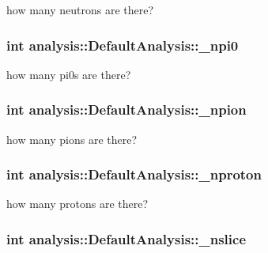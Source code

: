 how many neutrons are there? \hypertarget{classanalysis_1_1DefaultAnalysis_ab6eca9a94c20a6fb7e127043f165ff9b}{
\subsubsection[{\-\_\-npi0}]{\setlength{\rightskip}{0pt plus 5cm}int analysis\-::\-Default\-Analysis\-::\-\_\-npi0\hspace{0.3cm}{\ttfamily [private]}}}\label{classanalysis_1_1DefaultAnalysis_ab6eca9a94c20a6fb7e127043f165ff9b}
how many pi0s are there? \hypertarget{classanalysis_1_1DefaultAnalysis_a39a918abd4b60bf475907f5778ba5e9a}{
\subsubsection[{\-\_\-npion}]{\setlength{\rightskip}{0pt plus 5cm}int analysis\-::\-Default\-Analysis\-::\-\_\-npion\hspace{0.3cm}{\ttfamily [private]}}}\label{classanalysis_1_1DefaultAnalysis_a39a918abd4b60bf475907f5778ba5e9a}
how many pions are there? \hypertarget{classanalysis_1_1DefaultAnalysis_a10ce44826114a375e883d727ed0ad876}{
\subsubsection[{\-\_\-nproton}]{\setlength{\rightskip}{0pt plus 5cm}int analysis\-::\-Default\-Analysis\-::\-\_\-nproton\hspace{0.3cm}{\ttfamily [private]}}}\label{classanalysis_1_1DefaultAnalysis_a10ce44826114a375e883d727ed0ad876}
how many protons are there? \hypertarget{classanalysis_1_1DefaultAnalysis_a3eddf49910782afed7f324755fffe681}{
\subsubsection[{\-\_\-nslice}]{\setlength{\rightskip}{0pt plus 5cm}int analysis\-::\-Default\-Analysis\-::\-\_\-nslice\hspace{0.3cm}{\ttfamily [private]}}}\label{classanalysis_1_1DefaultAnalysis_a3eddf49910782afed7f324755fffe681}
